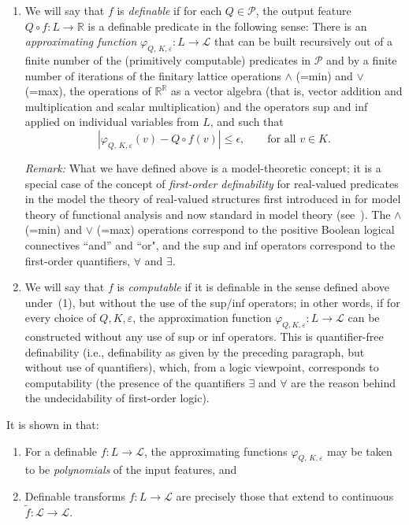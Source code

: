 \documentclass[psamsfonts]{amsart}
\theoremstyle{definition}
\theoremstyle{remark}
\numberwithin{equation}{section}
\begin{document}
 \begin{enumerate}
 \item
We will say that $f$  is \emph{definable}  if for each $Q\in\mathcal{P}$, the output feature $Q{\circ}f: L\to\mathbb{R}$ is a definable predicate in the following sense: There is an \emph{approximating function} $\varphi_{Q,\,K,\varepsilon}: L\to \mathcal{L}$ that can be built recursively out of a finite number of the (primitively computable) predicates in $\mathcal{P}$
and by a finite number of iterations of the finitary lattice operations $\land$ (=min) and $\lor$ (=max), the operations of $\mathbb{R}^\mathbb{R}$ as a vector algebra (that is, vector addition and multiplication and scalar multiplication) and the operators sup and inf applied on individual variables from $L$, and such that 
\[
| \varphi_{Q,\,K,\varepsilon}(v)- Q{\circ}f(v)|\le \epsilon,
\qquad
\text{for all $v\in K$}.
\]

\emph{Remark:} What we have defined above is a model-theoretic concept; it is a special case of the concept of \emph{first-order definability}  for real-valued predicates in the model the theory of real-valued structures first introduced in \cite{Iovino:1994} for model theory of functional analysis and now standard in model theory (see~\cite{Keisler:2023}).
The  $\land$ (=min) and $\lor$ (=max) operations correspond to the  positive Boolean logical connectives  ``and'' and ``or", and the sup and inf operators correspond to the first-order quantifiers, $\forall$ and $\exists$.
\item
We will say that $f$  is \emph{computable} if it is definable in the sense defined above under~(1), but without the use of the sup/inf operators; in other words, if for every choice of $Q,K,\varepsilon$, the approximation function $\varphi_{Q,K,\varepsilon}: L\to \mathcal{L}$ can be constructed without any use of sup or inf operators.
This is quantifier-free definability (i.e., definability as given by the preceding paragraph, but without use of quantifiers), which, from a logic viewpoint,  corresponds to computability (the presence of the quantifiers $\exists$ and $\forall$ are the reason behind the undecidability of first-order logic).
  \end{enumerate}
  

It is shown in \cite{alva2024approximability} that:
\begin{enumerate}
\item For a definable $f: L\to \mathcal{L}$, the approximating functions $\varphi_{Q,\,K,\varepsilon}$  may be taken to be \emph{polynomials} of the input features, and
\item Definable transforms $f: L\to\mathcal{L}$ are precisely those that extend to continuous $\tilde{f}: \mathcal{L} \to \mathcal{L}$.
\end{enumerate}
\end{document}
